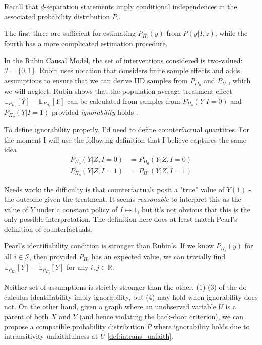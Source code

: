 Recall that $d$-separation statements imply conditional independences in the associated probability distribution $P_\cdot$.

The first three are sufficient for estimating $P_{\Pi_i}(y)$ from $P(y|I,z)$, while the fourth has a more complicated estimation procedure.

In the Rubin Causal Model, the set of interventions considered is two-valued: $\mathcal{I}=\{0,1\}$. Rubin uses notation that considers finite sample effects and adds assumptions to ensure that we can derive IID samples from $P_{\Pi_0}$ and $P_{\Pi_1}$, which we will neglect. Rubin shows that the population average treatment effect $\mathbb{E}_{P_{\Pi_1}} [Y] - \mathbb{E}_{P_{\Pi_0}} [Y]$ can be calculated from samples from $P_{\Pi_o}(Y|I=0)$ and $P_{\Pi_o}(Y|I=1)$ provided \emph{ignorability} holds \cite{rubin_causal_2005}.

To define ignorability properly, I'd need to define counterfactual quantities. For the moment I will use the following definition that I believe captures the same idea
\begin{align}
    P_{\Pi_o}(Y|Z,I=0) &= P_{\Pi_0}(Y|Z,I=0) \\
    P_{\Pi_o}(Y|Z,I=1) &= P_{\Pi_1}(Y|Z,I=1)
\end{align}

Needs work: the difficulty is that counterfactuals posit a "true" value of $Y(1)$ - the outcome given the treatment. It seems \emph{reasonable} to interpret this as the value of $Y$ under a constant policy of $I\mapsto 1$, but it's not obvious that this is the only possible interpretation. The definition here does at least match Pearl's definition of counterfactuals.

Pearl's identifiability condition is stronger than Rubin's. If we know $P_{\Pi_i}(y)$ for all $i\in \mathcal{I}$, then provided $P_{\Pi_i}$ has an expected value, we can trivially find $\mathbb{E}_{P_{\Pi_i}} [Y] - \mathbb{E}_{P_{\Pi_j}} [Y]$ for any $i,j\in\mathbb{R}$.

Neither set of assumptions is strictly stronger than the other. (1)-(3) of the do-calculus identifiability imply ignorability, but (4) may hold when ignorability does not. On the other hand, given a graph where an unobserved variable $U$ is a parent of both $X$ and $Y$ (and hence violating the back-door criterion), we can propose a compatible probability distribution $P$ where ignorability holds due to intransitivity unfaithfulness at $U$ \ref{def:intrans_unfaith}.

